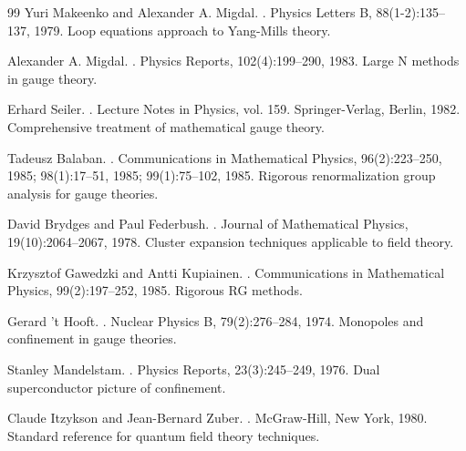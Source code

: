 \documentclass[12pt]{article}
\begin{document}
\begin{thebibliography}{99}
Yuri Makeenko and Alexander A. Migdal.
.
\newblock Physics Letters B, 88(1-2):135--137, 1979.
\newblock Loop equations approach to Yang-Mills theory.

Alexander A. Migdal.
.
\newblock Physics Reports, 102(4):199--290, 1983.
\newblock Large N methods in gauge theory.

Erhard Seiler.
.
\newblock Lecture Notes in Physics, vol. 159. Springer-Verlag, Berlin, 1982.
\newblock Comprehensive treatment of mathematical gauge theory.

Tadeusz Balaban.
.
\newblock Communications in Mathematical Physics, 96(2):223--250, 1985; 98(1):17--51, 1985; 99(1):75--102, 1985.
\newblock Rigorous renormalization group analysis for gauge theories.

David Brydges and Paul Federbush.
.
\newblock Journal of Mathematical Physics, 19(10):2064--2067, 1978.
\newblock Cluster expansion techniques applicable to field theory.

Krzysztof Gawedzki and Antti Kupiainen.
.
\newblock Communications in Mathematical Physics, 99(2):197--252, 1985.
\newblock Rigorous RG methods.

Gerard 't Hooft.
.
\newblock Nuclear Physics B, 79(2):276--284, 1974.
\newblock Monopoles and confinement in gauge theories.

Stanley Mandelstam.
.
\newblock Physics Reports, 23(3):245--249, 1976.
\newblock Dual superconductor picture of confinement.

Claude Itzykson and Jean-Bernard Zuber.
.
\newblock McGraw-Hill, New York, 1980.
\newblock Standard reference for quantum field theory techniques.


\end{thebibliography}
\end{document}
